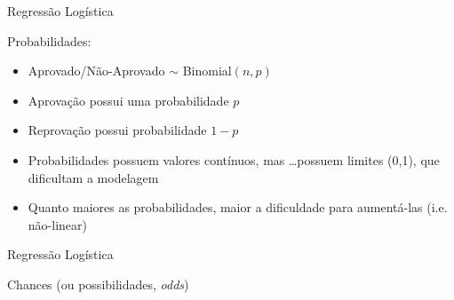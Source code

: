 \documentclass{beamer}\usepackage[]{graphicx}\usepackage[]{color}
\begin{document}
\begin{frame}{Regressão Logística}

Probabilidades: 
\vfill
\begin{itemize}
\item Aprovado/Não-Aprovado $\sim$  Binomial$(n,p)$
\vfill
\item Aprovação possui uma probabilidade $p$ 
\vfill
\item Reprovação possui probabilidade $1-p$ \pause
\vfill
\item Probabilidades possuem valores contínuos, mas \ldots \pause possuem limites (0,1), que dificultam a modelagem \pause
\vfill
\item Quanto maiores as probabilidades, maior a dificuldade para aumentá-las (i.e. não-linear)
\end{itemize}

\end{frame}

\begin{frame}{Regressão Logística}

Chances (ou possibilidades, \emph{odds})
\vfill
{}

\end{frame}
\end{document}
